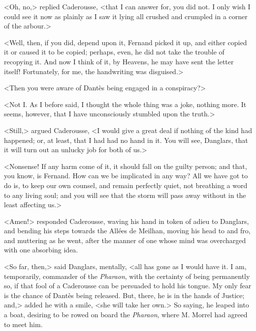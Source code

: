  <Oh, no,> replied Caderousse, <that I can answer for, you did not. I only wish I could see it now as plainly as I saw it lying all crushed and crumpled in a corner of the arbour.> 

 <Well, then, if you did, depend upon it, Fernand picked it up, and either copied it or caused it to be copied; perhaps, even, he did not take the trouble of recopying it. And now I think of it, by Heavens, he may have sent the letter itself! Fortunately, for me, the handwriting was disguised.> 

 <Then you were aware of Dantès being engaged in a conspiracy?> 

 <Not I. As I before said, I thought the whole thing was a joke, nothing more. It seems, however, that I have unconsciously stumbled upon the truth.> 

 <Still,> argued Caderousse, <I would give a great deal if nothing of the kind had happened; or, at least, that I had had no hand in it. You will see, Danglars, that it will turn out an unlucky job for both of us.> 

 <Nonsense! If any harm come of it, it should fall on the guilty person; and that, you know, is Fernand. How can we be implicated in any way? All we have got to do is, to keep our own counsel, and remain perfectly quiet, not breathing a word to any living soul; and you will see that the storm will pass away without in the least affecting us.> 

 <Amen!> responded Caderousse, waving his hand in token of adieu to Danglars, and bending his steps towards the Allées de Meilhan, moving his head to and fro, and muttering as he went, after the manner of one whose mind was overcharged with one absorbing idea. 

 <So far, then,> said Danglars, mentally, <all has gone as I would have it. I am, temporarily, commander of the \textit{Pharaon}, with the certainty of being permanently so, if that fool of a Caderousse can be persuaded to hold his tongue. My only fear is the chance of Dantès being released. But, there, he is in the hands of Justice; and,> added he with a smile, <she will take her own.> So saying, he leaped into a boat, desiring to be rowed on board the \textit{Pharaon}, where M. Morrel had agreed to meet him. 